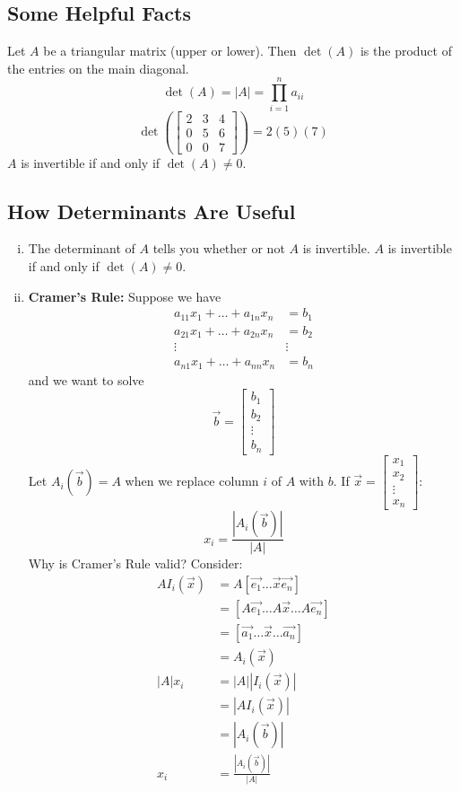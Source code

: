 \documentclass{math}
\begin{document}
\subsection*{Some Helpful Facts}
Let \( A \) be a triangular matrix (upper or lower). Then \( \det(A) \) is
the product of the entries on the main diagonal.
\[ \det(A) = |A| = \prod_{i=1}^{n}a_{ii} \]
\[ \det\left(\begin{bmatrix}2 & 3 & 4 \\ 0 & 5 & 6 \\ 0 & 0 & 7
  \end{bmatrix}\right) = 2(5)(7) \]
\( A \) is invertible if and only if \( \det(A) \ne 0 \).

\subsection*{How Determinants Are Useful}
\begin{enumerate}[(i)]
  \item The determinant of \( A \) tells you whether or not \( A \) is
  invertible. \( A \) is invertible if and only if \( \det(A) \ne 0 \).
  \item \textbf{Cramer's Rule:} Suppose we have
  \begin{align*}
    a_{11}x_1+\dots+a_{1n}x_n &= b_1 \\
    a_{21}x_1+\dots+a_{2n}x_n &= b_2 \\
    \vdots & \vdots \\
    a_{n1}x_1+\dots+a_{nn}x_n &= b_n
  \end{align*}
  and we want to solve
  \[ \vec{b} = \begin{bmatrix}b_1 \\ b_2 \\ \vdots \\ b_n\end{bmatrix} \]
  Let \( A_i(\vec{b}) = A \) when we replace column \( i \) of \( A \) with
  \( b \). If \( \vec{x} = \begin{bmatrix}x_1 \\ x_2 \\ \vdots \\ x_n
  \end{bmatrix} \):
  \[ x_i = \frac{|A_i(\vec{b})|}{|A|} \]
  Why is Cramer's Rule valid? Consider:
  \begin{align*}
    AI_i(\vec{x}) &= A[\vec{e_1}\dots\vec{x}\vec{e_n}] \\
    &= [A\vec{e_1}\dots A\vec{x}\dots A\vec{e_n}] \\
    &= [\vec{a_1}\dots\vec{x}\dots\vec{a_n}] \\
    &= A_i(\vec{x}) \\
    |A|x_i &= |A||I_i(\vec{x})| \\
    &= |AI_i(\vec{x})| \\
    &= |A_i(\vec{b})| \\
    x_i &= \frac{|A_i(\vec{b})|}{|A|}
  \end{align*}
\end{enumerate}
\end{document}

